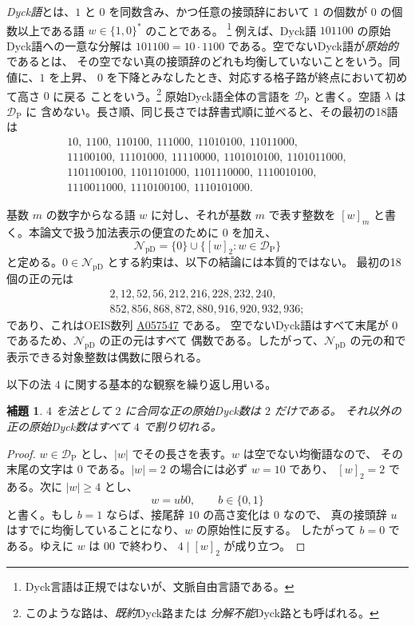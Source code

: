 \documentclass[12pt]{ltjsarticle}
\theoremstyle{plain}
\newtheorem{lemma}[theorem]{補題}
\theoremstyle{definition}
\theoremstyle{plain}
\newcommand{\val}[2]{[#1]_{#2}}
\newcommand{\NpD}{\mathcal{N}_{\mathrm{pD}}}
\newcommand{\DP}{\mathcal{D}_{\mathrm{P}}}
\newcommand{\seqnum}[1]{\href{https://oeis.org/#1}{\textrm{\underline{#1}}}}
\begin{document}
\emph{Dyck語}とは、$1$ と $0$ を同数含み、かつ任意の接頭辞において
$1$ の個数が $0$ の個数以上である語 $w\in\{1,0\}^*$ のことである。
\footnote{Dyck言語は正規ではないが、文脈自由言語である。}
例えば、Dyck語 $101100$ の原始Dyck語への一意な分解は
$101100=10\cdot1100$ である。空でないDyck語が\emph{原始的}であるとは、
その空でない真の接頭辞のどれも均衡していないことをいう。同値に、$1$ を上昇、
$0$ を下降とみなしたとき、対応する格子路が終点において初めて高さ $0$ に戻る
ことをいう。\footnote{このような路は、\emph{既約}Dyck路または
\emph{分解不能}Dyck路とも呼ばれる。}
原始Dyck語全体の言語を $\DP$ と書く。空語 $\lambda$ は $\DP$ に
含めない。長さ順、同じ長さでは辞書式順に並べると、その最初の18語は
\[
\begin{gathered}
10,\ 1100,\ 110100,\ 111000,\ 11010100,\ 11011000,\\
11100100,\ 11101000,\ 11110000,\ 1101010100,\ 1101011000,\\
1101100100,\ 1101101000,\ 1101110000,\ 1110010100,\\
1110011000,\ 1110100100,\ 1110101000.
\end{gathered}
\]

基数 $m$ の数字からなる語 $w$ に対し、それが基数 $m$ で表す整数を
$\val{w}{m}$ と書く。本論文で扱う加法表示の便宜のために $0$ を加え、
\[
 \NpD=\{0\}\cup\{\val{w}{2}:w\in\DP\}
\]
と定める。$0\in\NpD$ とする約束は、以下の結論には本質的ではない。
最初の18個の正の元は
\[
\begin{gathered}
2,12,52,56,212,216,228,232,240,\\
852,856,868,872,880,916,920,932,936;
\end{gathered}
\]
であり、これはOEIS数列 \seqnum{A057547} \cite{OEIS-A057547} である。
空でないDyck語はすべて末尾が $0$ であるため、$\NpD$ の正の元はすべて
偶数である。したがって、$\NpD$ の元の和で表示できる対象整数は偶数に限られる。

以下の法 $4$ に関する基本的な観察を繰り返し用いる。

\begin{lemma}\label{lem:mod4}
$4$ を法として $2$ に合同な正の原始Dyck数は $2$ だけである。
それ以外の正の原始Dyck数はすべて $4$ で割り切れる。
\end{lemma}

\begin{proof}
$w\in\DP$ とし、$|w|$ でその長さを表す。$w$ は空でない均衡語なので、
その末尾の文字は $0$ である。$|w|=2$ の場合には必ず $w=10$ であり、
$[w]_2=2$ である。次に $|w|\geq4$ とし、
\[
 w=ub0,\qquad b\in\{0,1\}
\]
と書く。もし $b=1$ ならば、接尾辞 $10$ の高さ変化は $0$ なので、
真の接頭辞 $u$ はすでに均衡していることになり、$w$ の原始性に反する。
したがって $b=0$ である。ゆえに $w$ は $00$ で終わり、
$4\mid[w]_2$ が成り立つ。
\end{proof}
\end{document}

